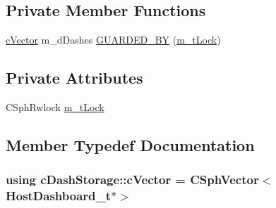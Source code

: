 \subsection*{Private Member Functions}
\begin{DoxyCompactItemize}
\item 
\hyperlink{classcDashStorage_ad27c7347a9f17da9d1c9b83f854a956e}{c\-Vector} m\-\_\-d\-Dashes \hyperlink{classcDashStorage_a969df354d533c79a111b3eb7fdc9fe4e}{G\-U\-A\-R\-D\-E\-D\-\_\-\-B\-Y} (\hyperlink{classcDashStorage_a6d5edb496c579d6b07951f76040a146c}{m\-\_\-t\-Lock})
\end{DoxyCompactItemize}
\subsection*{Private Attributes}
\begin{DoxyCompactItemize}
\item 
C\-Sph\-Rwlock \hyperlink{classcDashStorage_a6d5edb496c579d6b07951f76040a146c}{m\-\_\-t\-Lock}
\end{DoxyCompactItemize}


\subsection{Member Typedef Documentation}
\hypertarget{classcDashStorage_ad27c7347a9f17da9d1c9b83f854a956e}{
\subsubsection[{c\-Vector}]{\setlength{\rightskip}{0pt plus 5cm}using {\bf c\-Dash\-Storage\-::c\-Vector} =  {\bf C\-Sph\-Vector}$<${\bf Host\-Dashboard\-\_\-t}$\ast$$>$\hspace{0.3cm}{\ttfamily [private]}}}\label{classcDashStorage_ad27c7347a9f17da9d1c9b83f854a956e}



